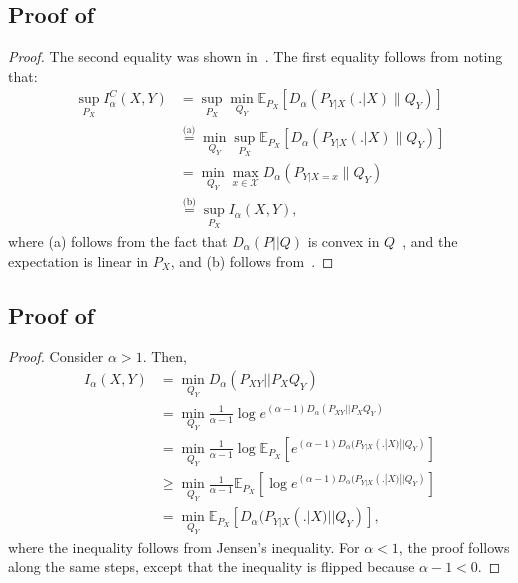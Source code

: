 \documentclass{article}
\numberwithin{theorem}{section}
\numberwithin{example}{section}
\numberwithin{remark}{section}
\numberwithin{definition}{section}
\newcommand{\E}{\mathbb{E}}
\newcommand{\X}{\mathcal{X}}
\begin{document}
\subsection{Proof of~}\label{app:proof:prof:csiszarMI-max}
\begin{proof}
    The second equality was shown in~. The first equality follows from noting that:
    \begin{align}
        \sup_{P_X} I_\alpha^C(X,Y)  & = \sup_{P_X} \min_{Q_Y} \E_{P_X} \left[  D_\alpha \left( P_{Y|X}(.|X) \| Q_Y \right)\right] \\
        & \stackrel{\text{(a)}} = \min_{Q_Y} \sup_{P_X} \E_{P_X} \left[  D_\alpha \left( P_{Y|X}(.|X) \| Q_Y \right)\right] \\
        & = \min_{Q_Y} \max_{x \in \X}  D_\alpha \left( P_{Y|X=x} \| Q_Y \right) \\
        & \stackrel{\text{(b)}} = \sup_{P_X} I_\alpha(X,Y),
    \end{align}
    where (a) follows from the fact that $D_\alpha(P ||Q)$ is convex in $Q$~\cite[Theorem 12]{renyiDiv}, and the expectation is linear in $P_X$, and (b) follows from~.
\end{proof}
\subsection{Proof of~}\label{app:proof:prop:csiszar-sibson-ordering}
\begin{proof}
    Consider $\alpha >1$. Then,
    \begin{align}
        I_\alpha(X,Y) & = \min_{Q_Y} D_\alpha( P_{XY} || P_X Q_Y)  \\
        & = \min_{Q_Y} \frac{1}{\alpha-1} \log e^{(\alpha-1) D_\alpha( P_{XY} || P_X Q_Y) } \\
        & =  \min_{Q_Y} \frac{1}{\alpha-1} \log \E_{P_X} \left[ e^{(\alpha-1) D_\alpha(P_{Y|X}(.|X) || Q_Y) }       \right] \\
        & \geq \min_{Q_Y}\frac{1}{\alpha-1} \E_{P_X} \left[ \log  e^{(\alpha-1) D_\alpha(P_{Y|X}(.|X) || Q_Y) }       \right] \\
        & = \min_{Q_Y} \E_{P_X} \left[ D_\alpha (P_{Y|X}(.|X) || Q_Y) \right],
    \end{align}
    where the inequality follows from Jensen's inequality. For $\alpha <1$, the proof follows along the same steps, except that the inequality is flipped because $\alpha-1 < 0$.
\end{proof}
\end{document}
